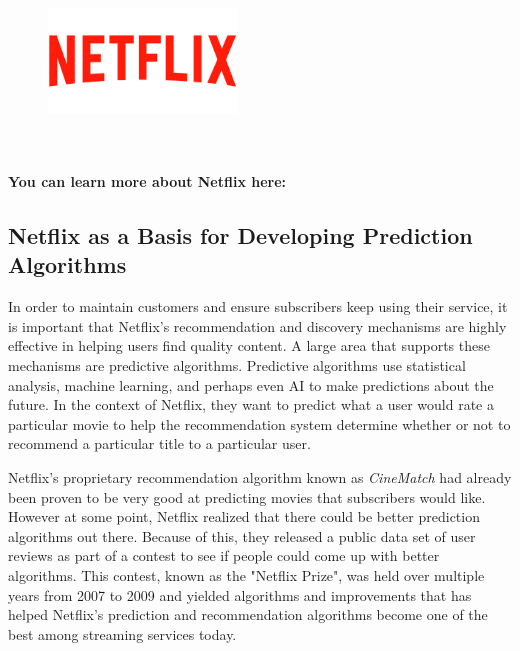 \documentclass{article}
\begin{document}
\begin{figure}[hbt!]
\vspace{-0.3cm}
\centering
\includegraphics[width=5cm]{images/Netflix-Logo}
\vspace{-1.2cm}
\end{figure}

\-\ \\ \\ \noindent \textbf{You can learn more about Netflix here:} \href{https://en.wikipedia.org/wiki/Netflix}{\color{blue}{https://en.wikipedia.org/wiki/Netflix}}




\subsection*{Netflix as a Basis for Developing Prediction Algorithms}
In order to maintain customers and ensure subscribers keep using their service, it is important that Netflix's recommendation and discovery mechanisms are highly effective in helping users find quality content. A large area that supports these mechanisms are predictive algorithms. Predictive algorithms use statistical analysis, machine learning, and perhaps even AI to make predictions about the future. In the context of Netflix, they want to predict what a user would rate a particular movie to help the recommendation system determine whether or not to recommend a particular title to a particular user. 

Netflix's proprietary recommendation algorithm known as \textit{CineMatch} had already been proven to be very good at predicting movies that subscribers would like. However at some point, Netflix realized that there could be better prediction algorithms out there. Because of this, they released a public data set of user reviews as part of a contest to see if people could come up with better algorithms. This contest, known as the "Netflix Prize", was held over multiple years from 2007 to 2009 and yielded algorithms and improvements that has helped Netflix's  prediction and recommendation algorithms become one of the best among streaming services today. 
\end{document}
